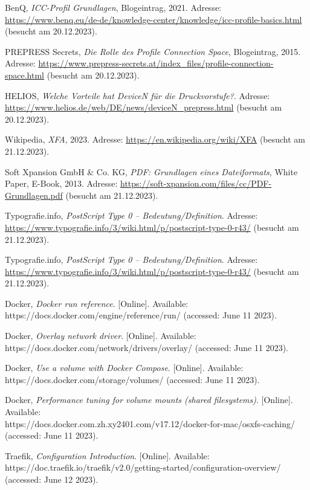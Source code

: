 \begin{referenceslist}
	\itemk BenQ, \emph{ICC-Profil Grundlagen}, Blogeintrag, 2021. Adresse: \url{https://www.benq.eu/de-de/knowledge-center/knowledge/icc-profile-basics.html} (besucht am 20.12.2023).
	
	\iteml PREPRESS Secrets, \emph{Die Rolle des Profile Connection Space}, Blogeintrag, 2015. Adresse: \url{https://www.prepress-secrets.at/index_files/profile-connection-space.html} (besucht am 20.12.2023).
	
	\itemm HELIOS, \emph{Welche Vorteile hat DeviceN für die Druckvorstufe?}. Adresse: \url{https://www.helios.de/web/DE/news/deviceN_prepress.html} (besucht am 20.12.2023).
	
	\itemn Wikipedia, \emph{XFA}, 2023. Adresse: \url{https://en.wikipedia.org/wiki/XFA} (besucht am 21.12.2023).
	
	\itemo Soft Xpansion GmbH \& Co. KG, \emph{PDF: Grundlagen eines Dateiformats}, White Paper, E-Book, 2013. Adresse: \url{https://soft-xpansion.com/files/cc/PDF-Grundlagen.pdf} (besucht am 21.12.2023).
	
	\itemp Typografie.info, \emph{PostScript Type 0 – Bedeutung/Definition}. Adresse: \url{https://www.typografie.info/3/wiki.html/p/postscript-type-0-r43/} (besucht am 21.12.2023).
	
	\itemq Typografie.info, \emph{PostScript Type 0 – Bedeutung/Definition}. Adresse: \url{https://www.typografie.info/3/wiki.html/p/postscript-type-0-r43/} (besucht am 21.12.2023).
	
	\itemr Docker, \emph{Docker run reference}. [Online]. Available: \\
	https://docs.docker.com/engine/reference/run/  (accessed: June 11 2023).
	
	\items Docker, \emph{Overlay network driver}. [Online]. Available: \\
	https://docs.docker.com/network/drivers/overlay/  (accessed: June 11 2023).
	
	\itemt Docker, \emph{Use a volume with Docker Compose}. [Online]. Available: \\
	https://docs.docker.com/storage/volumes/  (accessed: June 11 2023).
	
	\itemu Docker, \emph{Performance tuning for volume mounts (shared filesystems)}. [Online]. Available: \\
	https://docs.docker.com.zh.xy2401.com/v17.12/docker-for-mac/osxfs-caching/  (accessed: June 11 2023).
	
	\itemv Traefik, \emph{Configuration Introduction}. [Online]. Available: \\
	https://doc.traefik.io/traefik/v2.0/getting-started/configuration-overview/  (accessed: June 12 2023).
\end{referenceslist}
